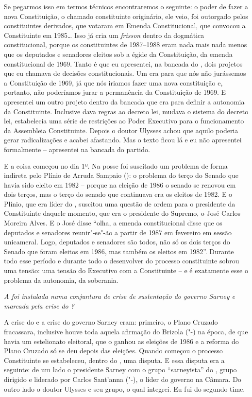Se pegarmos isso em termos técnicos encontraremos o seguinte: o poder de
fazer a nova Constituição, o chamado constituinte originário, ele veio,
foi outorgado pelos constituintes derivados, que votaram em Emenda
Constitucional, que convocou a Constituinte em 1985\ldots{} Isso já cria um
\emph{frisson} dentro da dogmática constitucional, porque os constituintes
de 1987--1988 eram nada mais nada menos que os deputados e senadores
eleitos sob a égide da Constituição, da emenda constitucional de 1969.
Tanto é que eu apresentei, na bancada do , dois projetos que eu
chamava de decisões constitucionais. Um era para que nós não jurássemos
a Constituição de 1969, já que nós iriamos fazer uma nova constituição
e, portanto, não poderíamos jurar a permanência da Constituição de 1969.
E apresentei um outro projeto dentro da bancada que era para definir a
autonomia da Constituinte. Inclusive dava regras ao decreto lei, mudava
o sistema do decreto lei, estabelecia uma série de restrições ao Poder
Executivo para o funcionamento da Assembleia Constituinte. Depois o
doutor Ulysses achou que aquilo poderia gerar radicalizações e acabei
afastando. Mas o texto ficou lá e eu não apresentei formalmente --
apresentei na bancada do partido.

E a coisa começou no dia 1º. Na posse foi suscitado um problema de forma
indireta pelo Plínio de Arruda Sampaio (): o problema do terço do
Senado que havia sido eleito em 1982 -- porque na eleição de 1986 o
senado se renovou em dois terços, mas o terço do senado que continuava
era os eleitos de 1982. E o Plínio, que era líder do , suscitou uma
questão de ordem para o presidente da Constituinte daquele momento, que
era o presidente do Supremo, o José Carlos Moreira Alves. E o José disse
``olha, a emenda constitucional disse que os deputados e senadores
reunir"-se"-ão a partir de 1987 em fevereiro em sessão unicameral. Logo,
deputados e senadores são todos, não só os dois terços do Senado que
foram eleitos em 1986, mas também os eleitos em 1982''. Durante todo esse
período e durante todo o desenvolver do processo constituinte sobrou uma
tensão: uma tensão do Executivo com a Constituinte -- e é exatamente
esse o problema da autonomia, da soberania.

\medskip

\noindent\emph{A  foi instalada numa conjuntura de crise de sustentação do
governo Sarney e marcada pela crise do ?}

A crise do  e a crise do governo Sarney eram:
primeiro, o Plano Cruzado fracassara, inclusive houve toda aquela
afirmação do Brizola ("-) na época, de que havia um estelionato
eleitoral, que o  ganhou as eleições de 1986 e a reforma do Plano
Cruzado só se deu depois das eleições. Quando começou o processo
Constituinte se estabeleceu, dentro do , uma disputa. E essa disputa
era a seguinte: de um lado o presidente Sarney com o grupo ``sarneyista''
do , grupo dirigido e liderado por Carlos Sant'anna ("-), o líder
do governo na Câmara. Do outro lado o doutor Ulysses e seu grupo, o qual
integrei. Eu fui do segundo time.

